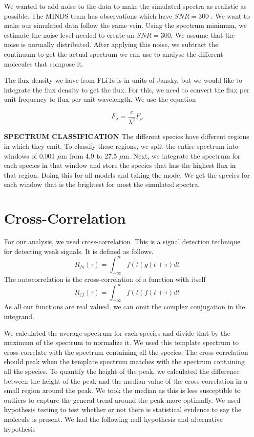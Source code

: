 \documentclass[twoside, single, authoryear, semicolon]{lion-msc}
\newcommand{\3}{$_3$}
\newcommand{\2}{$_2$}
\begin{document}
We wanted to add noise to the data to make the simulated spectra as realistic as possible. The MINDS team has observations which have $SNR = 300$ \citep{SOURCE}. We want to make our simulated data follow the same vein. Using the spectrum minimum, we estimate the noise level needed to create an $SNR = 300$. We assume that the noise is normally distributed. After applying this noise, we subtract the continuum to get the actual spectrum we can use to analyse the different molecules that compose it.


The flux density we have from FLiTs is in units of Jansky, but we would like to integrate the flux density to get the flux. For this, we need to convert the flux per unit frequency to flux per unit wavelength. We use the equation

\begin{equation}
    F_\lambda=\frac{c}{\lambda^2}F_\nu
\end{equation}

\textbf{SPECTRUM CLASSIFICATION}
The different species have different regions in which they emit. To classify these regions, we split the entire spectrum into windows of 0.001 $\mu$m from 4.9 to 27.5 $\mu$m. Next, we integrate the spectrum for each species in that window and store the species that has the highest flux in that region. Doing this for all models and taking the mode. We get the species for each window that is the brightest for most the simulated spectra.  
\section{Cross-Correlation}
For our analysis, we used cross-correlation. This is a signal detection technique for detecting weak signals. It is defined as follows. 
\begin{equation}
    R_{fg}(\tau)=\int^\infty_{-\infty}\overline{f(t)}g(t+\tau)dt
\end{equation}
The autocorrelation is the cross-correlation of a function with itself
\begin{equation}
    R_{ff}(\tau)=\int^\infty_{-\infty}\overline{f(t)}f(t+\tau)dt
\end{equation}
As all our functions are real valued, we can omit the complex conjugation in the integrand.

We calculated the average spectrum for each species and divide that by the maximum of the spectrum to normalize it. We used this template spectrum to cross-correlate with the spectrum containing all the species. The cross-correlation should peak when the template spectrum matches with the spectrum containing all the species. To quantify the height of the peak, we calculated the difference between the height of the peak and the median value of the cross-correlation in a small region around the peak. We took the median as this is less susceptible to outliers to capture the general trend around the peak more optimally. We used hypothesis testing to test whether or not there is statistical evidence to say the molecule is present. We had the following null hypothesis and alternative hypothesis
\end{document}
